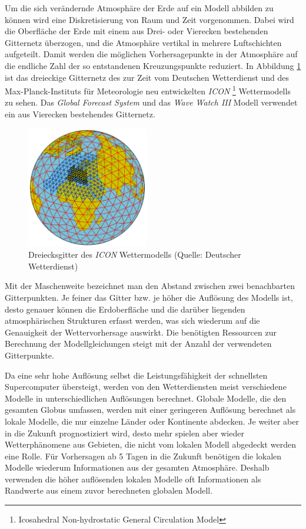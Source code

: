 Um die sich verändernde Atmosphäre der Erde auf ein Modell abbilden zu
können wird eine Diskretisierung von Raum und Zeit vorgenommen. Dabei
wird die Oberfläche der Erde mit einem aus Drei- oder Vierecken
bestehenden Gitternetz überzogen, und die Atmosphäre vertikal in
mehrere Luftschichten aufgeteilt. Damit werden die möglichen
Vorhersagepunkte in der Atmosphäre auf die endliche Zahl der so
entstandenen Kreuzungspunkte reduziert. In Abbildung \ref{gitternetz}
ist das dreieckige Gitternetz des zur Zeit vom Deutschen Wetterdienst
und des Max-Planck-Instituts für Meteorologie neu entwickelten
\textit{ICON} \footnote{Icosahedral Non-hydrostatic General
  Circulation Model}  Wettermodells zu sehen. Das
\textit{Global Forecast System} und das \textit{Wave Watch III} Modell
verwendet ein aus Vierecken bestehendes Gitternetz.

\begin{figure}[h]
  \begin{center}
    \includegraphics[height=200px]{bilder/gitternetz}
    \caption{Dreiecksgitter des \textit{ICON} Wettermodells (Quelle:
      Deutscher Wetterdienst)}
    \label{gitternetz}
  \end{center}
\end{figure}

Mit der Maschenweite bezeichnet man den Abstand zwischen zwei
benachbarten Gitterpunkten. Je feiner das Gitter bzw. je höher die
Auflösung des Modells ist, desto genauer können die Erdoberfläche und
die darüber liegenden atmosphärischen Strukturen erfasst werden, was
sich wiederum auf die Genauigkeit der Wettervorhersage auswirkt. Die
benötigten Ressourcen zur Berechnung der Modellgleichungen steigt mit
der Anzahl der verwendeten Gitterpunkte.

Da eine sehr hohe Auflösung selbst die Leistungsfähigkeit der
schnellsten Supercomputer übersteigt, werden von den Wetterdiensten
meist verschiedene Modelle in unterschiedlichen Auflösungen
berechnet. Globale Modelle, die den gesamten Globus umfassen, werden
mit einer geringeren Auflösung berechnet als lokale Modelle, die nur
einzelne Länder oder Kontinente abdecken. Je weiter aber in die
Zukunft prognostiziert wird, desto mehr spielen aber wieder
Wetterphänomene aus Gebieten, die nicht vom lokalen Modell abgedeckt
werden eine Rolle. Für Vorhersagen ab 5 Tagen in die Zukunft benötigen
die lokalen Modelle wiederum Informationen aus der gesamten
Atmosphäre. Deshalb verwenden die höher auflösenden lokalen Modelle
oft Informationen als Randwerte aus einem zuvor berechneten globalen
Modell.

